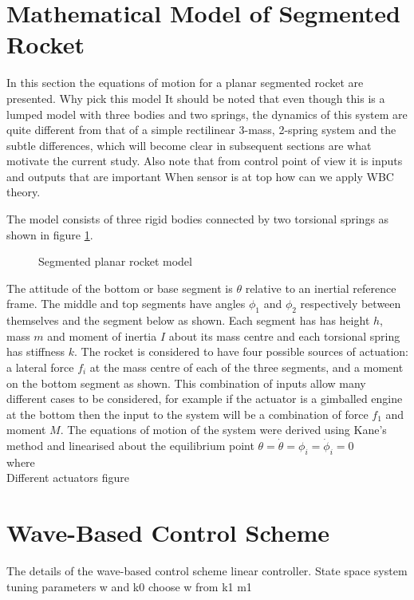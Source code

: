 \documentclass{mbd_fullpaper}
\begin{document}
\section{Mathematical Model of Segmented Rocket}
In this section the equations of motion for a planar segmented rocket are presented.
Why pick this model
It should be noted that even though this is a lumped model with three bodies and two springs, the dynamics of this system are quite different from that of a simple rectilinear 3-mass, 2-spring system and the subtle differences, which will become clear in subsequent sections are what motivate the current study.
Also note that from control point of view it is inputs and outputs that are important
When sensor is at top how can we apply WBC theory.

The model consists of three rigid bodies connected by two torsional springs as shown in figure \ref{fig:rocket-model}.

\begin{figure}[h]
  \begin{center}
    \caption{Segmented planar rocket model \label{fig:rocket-model}}
  \end{center}
\end{figure}
The attitude of the bottom or base segment is $\theta$ relative to an inertial reference frame.
The middle and top segments have angles $\phi_1$ and $\phi_2$ respectively between themselves and the segment below as shown.
Each segment has has height $h$, mass $m$ and moment of inertia $I$ about its mass centre and each torsional spring has stiffness $k$.
The rocket is considered to have four possible sources of actuation: a lateral force $f_i$ at the mass centre of each of the three segments, and a moment on the bottom segment as shown.
This combination of inputs allow many different cases to be considered, for example if the actuator is a gimballed engine at the bottom then the input to the system will be a combination of force $f_1$ and moment $M$.
The equations of motion of the system were derived using Kane's method \cite{Kane1980} and linearised about the equilibrium point $\theta=\dot{\theta}=\phi_i=\dot{\phi}_i=0$
\begin{equation}
\end{equation}
where
\begin{equation}

\end{equation}
Different actuators
figure

\section{Wave-Based Control Scheme}
The details of the wave-based control scheme
linear controller. State space system
tuning parameters w and k0
choose w from k1 m1
\end{document}
